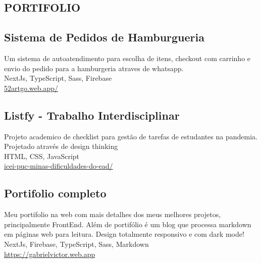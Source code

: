 
\begin{framed}
  \section{PORTIFOLIO}
  \small\subsection{Sistema de Pedidos de Hamburgueria}
  Um sistema de autoatendimento para escolha de itens, checkout com carrinho e envio do pedido para a hamburgeria atraves de whatsapp.\\
  \footnotesize{NextJs, TypeScript, Sass, Firebase}\\
  \href{https://52artgo.web.app/}{52artgo.web.app/}

  \small\subsection{Listfy - Trabalho Interdisciplinar}
  Projeto academico de checklist para gestão de tarefas de estudantes na pandemia. Projetado através de design thinking\\
  \footnotesize{HTML, CSS, JavaScript}\\
  \href{https://icei-puc-minas-pples-ti.github.io/plf-es-2021-1-ti1-7924100-dificuldades-do-ead/}{icei-puc-minas-dificuldades-do-ead/}

  \small\subsection{Portifolio completo}
  Meu portifolio na web com mais detalhes dos meus melhores projetos, principalmente FrontEnd. Além de portifólio é um blog que processa markdown em páginas web para leitura. Design totalmente responsivo e com dark mode!  \\
  \footnotesize{NextJs, Firebase, TypeScript, Sass, Markdown}\\
  \href{https://gabrielvictor.web.app}{https://gabrielvictor.web.app}
\end{framed}
